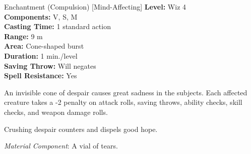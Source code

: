 {Enchantment (Compulsion) [Mind-Affecting]}
{
	\textbf{Level:}
	Wiz 4\\
	\textbf{Components:}
	V, S, M\\
	\textbf{Casting Time:}
	1 standard action\\
	\textbf{Range:}
	9 m\\
	\textbf{Area:}
	Cone-shaped burst\\
	\textbf{Duration:}
	1 min./level\\
	\textbf{Saving Throw:}
	Will negates\\
	\textbf{Spell Resistance:}
	Yes\\
}
{
	An invisible cone of despair causes great sadness in the subjects. Each affected creature takes a -2 penalty on attack rolls, saving throws, ability checks, skill checks, and weapon damage rolls.

	Crushing despair counters and dispels good hope.

	\textit{Material Component}:
	A vial of tears.

}
